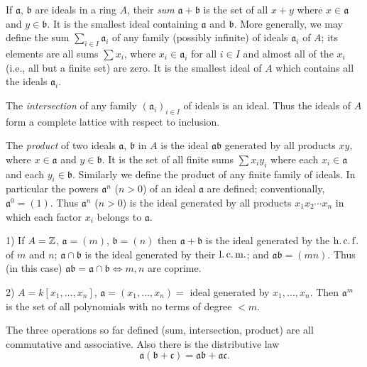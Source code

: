 
If $\mathfrak{a}$, $\mathfrak{b}$ are ideals in a ring $A$, their \emph{sum} $\mathfrak{a} + \mathfrak{b}$ is the set of all $x + y$ where $x \in \mathfrak{a}$ and $y \in \mathfrak{b}$. It is the smallest ideal containing $\mathfrak{a}$ and $\mathfrak{b}$. More generally, we may define the sum $\sum_{i \in I} \mathfrak{a}_i$ of any family (possibly infinite) of ideals $\mathfrak{a}_i$ of $A$; its elements are all sums $\sum x_i$, where $x_i \in \mathfrak{a}_i$ for all $i \in I$ and almost all of the $x_i$ (i.e., all but a finite set) are zero. It is the smallest ideal of $A$ which contains all the ideals $\mathfrak{a}_i$.

The \emph{intersection} of any family $(\mathfrak{a}_i)_{i \in I}$ of ideals is an ideal. Thus the ideals of $A$ form a complete lattice with respect to inclusion.

The \emph{product} of two ideals $\mathfrak{a}$, $\mathfrak{b}$ in $A$ is the ideal $\mathfrak{a}\mathfrak{b}$ generated by all products $xy$, where $x \in \mathfrak{a}$ and $y \in \mathfrak{b}$. It is the set of all finite sums $\sum x_i y_i$ where each $x_i \in \mathfrak{a}$ and each $y_i \in \mathfrak{b}$. Similarly we define the product of any finite family of ideals. In particular the powers $\mathfrak{a}^n$ ($n > 0$) of an ideal $\mathfrak{a}$ are defined; conventionally, $\mathfrak{a}^0 = (1)$. Thus $\mathfrak{a}^n$ ($n > 0$) is the ideal generated by all products $x_1 x_2 \cdots x_n$ in which each factor $x_i$ belongs to $\mathfrak{a}$.

\begin{examples}
1) If $A = \mathbb{Z}$, $\mathfrak{a} = (m)$, $\mathfrak{b} = (n)$ then $\mathfrak{a} + \mathfrak{b}$ is the ideal generated by the $\operatorname{h.c.f.}$ of $m$ and $n$; $\mathfrak{a} \cap \mathfrak{b}$ is the ideal generated by their $\operatorname{l.c.m.}$; and $\mathfrak{a}\mathfrak{b} = (mn)$. Thus (in this case) $\mathfrak{a}\mathfrak{b} = \mathfrak{a} \cap \mathfrak{b} \iff m, n$ are coprime.

2) $A = k[x_1, \ldots, x_n]$, $\mathfrak{a} = (x_1, \ldots, x_n) =$ ideal generated by $x_1, \ldots, x_n$. Then $\mathfrak{a}^m$ is the set of all polynomials with no terms of degree $< m$.
\end{examples}

The three operations so far defined (sum, intersection, product) are all commutative and associative. Also there is the distributive law
\[
    \mathfrak{a}(\mathfrak{b} + \mathfrak{c}) = \mathfrak{a}\mathfrak{b} + \mathfrak{a}\mathfrak{c}.
\]

